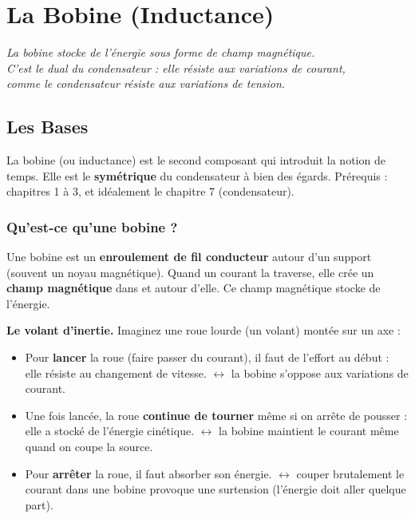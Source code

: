 \documentclass[12pt,a4paper,twoside]{book}
\begin{document}
\chapter{La Bobine (Inductance)}

\begin{center}
\textit{La bobine stocke de l'énergie sous forme de champ magnétique.\\
C'est le dual du condensateur : elle résiste aux variations de courant,\\
comme le condensateur résiste aux variations de tension.}
\end{center}

\vspace{0.5cm}

\section{Les Bases}

\begin{bases}
La bobine (ou inductance) est le second composant qui introduit la notion de temps. Elle est le \textbf{symétrique} du condensateur à bien des égards. Prérequis : chapitres 1 à 3, et idéalement le chapitre 7 (condensateur).
\end{bases}

\subsection{Qu'est-ce qu'une bobine ?}

Une bobine est un \textbf{enroulement de fil conducteur} autour d'un support (souvent un noyau magnétique). Quand un courant la traverse, elle crée un \textbf{champ magnétique} dans et autour d'elle. Ce champ magnétique stocke de l'énergie.

\begin{analogie}
\textbf{Le volant d'inertie.} Imaginez une roue lourde (un volant) montée sur un axe :
\begin{itemize}[nosep]
\item Pour \textbf{lancer} la roue (faire passer du courant), il faut de l'effort au début : elle résiste au changement de vitesse. $\leftrightarrow$ la bobine s'oppose aux variations de courant.
\item Une fois lancée, la roue \textbf{continue de tourner} même si on arrête de pousser : elle a stocké de l'énergie cinétique. $\leftrightarrow$ la bobine maintient le courant même quand on coupe la source.
\item Pour \textbf{arrêter} la roue, il faut absorber son énergie. $\leftrightarrow$ couper brutalement le courant dans une bobine provoque une surtension (l'énergie doit aller quelque part).
\end{itemize}
\end{analogie}
\end{document}
